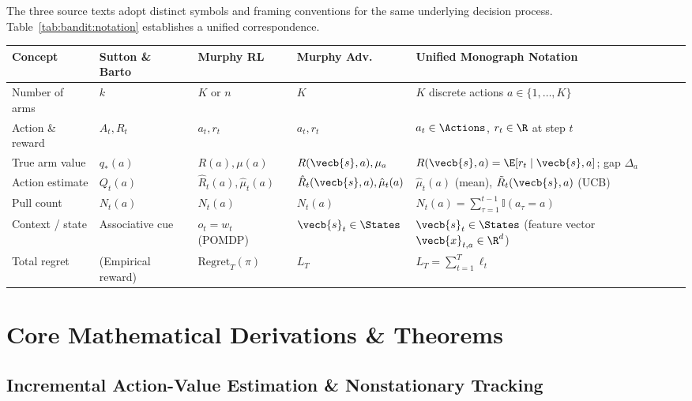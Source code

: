 \documentclass[../../../../master.tex]{subfiles}
\begin{document}
\begin{crossbook}
The three source texts adopt distinct symbols and framing conventions for the same underlying decision process. Table~\ref{tab:bandit:notation} establishes a unified correspondence.
\begin{center}
\small
\begin{tabularx}{\textwidth}{@{}l l l l X@{}}
\toprule
\textbf{Concept} & \textbf{Sutton \& Barto} & \textbf{Murphy RL} & \textbf{Murphy Adv.} & \textbf{Unified Monograph Notation} \\
\midrule
Number of arms & $k$ & $K$ or $n$ & $K$ & $K$ discrete actions $a \in \{1,\dots,K\}$ \\
Action \& reward & $A_t, R_t$ & $a_t, r_t$ & $a_t, r_t$ & $a_t \in \Actions$, $r_t \in \R$ at step $t$ \\
True arm value & $q_*(a)$ & $R(a), \mu(a)$ & $R(\vecb{s},a), \mu_a$ & $R(\vecb{s},a) = \E[r_t \mid \vecb{s}, a]$; gap $\Delta_a$ \\
Action estimate & $Q_t(a)$ & $\hat{R}_t(a), \hat{\mu}_t(a)$ & $\hat{R}_t(\vecb{s},a), \hat{\mu}_t(a)$ & $\hat{\mu}_t(a)$ (mean), $\tilde{R}_t(\vecb{s},a)$ (UCB) \\
Pull count & $N_t(a)$ & $N_t(a)$ & $N_t(a)$ & $N_t(a) = \sum_{\tau=1}^{t-1}\mathbb{I}(a_\tau=a)$ \\
Context / state & Associative cue & $o_t = w_t$ (POMDP) & $\vecb{s}_t \in \States$ & $\vecb{s}_t \in \States$ (feature vector $\vecb{x}_{t,a} \in \R^d$) \\
Total regret & (Empirical reward) & $\mathrm{Regret}_T(\pi)$ & $L_T$ & $L_T = \sum_{t=1}^T \ell_t$ \\
\bottomrule
\end{tabularx}
\label{tab:bandit:notation}
\end{center}
\end{crossbook}

\section{Core Mathematical Derivations \& Theorems}
\label{sec:bandit:derivations}

\subsection{Incremental Action-Value Estimation \& Nonstationary Tracking}
\end{document}
